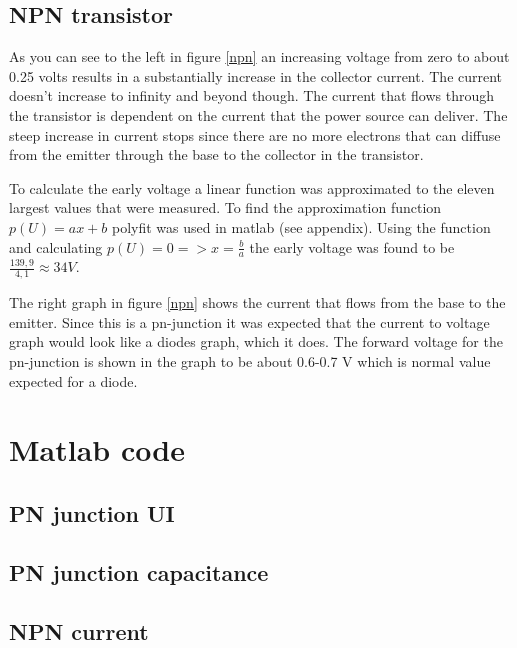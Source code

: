 \documentclass[a4paper]{article}
\begin{document}
\subsection{NPN transistor}
As you can see to the left in figure \ref{npn} an increasing voltage from zero to about 0.25 volts results in a substantially increase in the collector current. The current doesn't increase to infinity and beyond though. The current that flows through the transistor is dependent on the current that the power source can deliver. The steep increase in current stops since there are no more electrons that can diffuse from the emitter through the base to the collector in the transistor.

To calculate the early voltage a linear function was approximated to the eleven largest values that were measured. To find the approximation function $p(U) = ax + b$ polyfit was used in matlab (see appendix). Using the function and calculating $p(U) = 0 => x = \frac{b}{a}$ the early voltage was found to be $\frac{139,9}{4,1} \approx 34V$.

The right graph in figure \ref{npn} shows the current that flows from the base to the emitter. Since this is a pn-junction it was expected that the current to voltage graph would look like a diodes graph, which it does. The forward voltage for the pn-junction is shown in the graph to be about 0.6-0.7 V which is normal value expected for a diode.

\newpage
\appendix
\section{Matlab code}
\subsection{PN junction UI}

\subsection{PN junction capacitance}

\subsection{NPN current}

\end{document}
